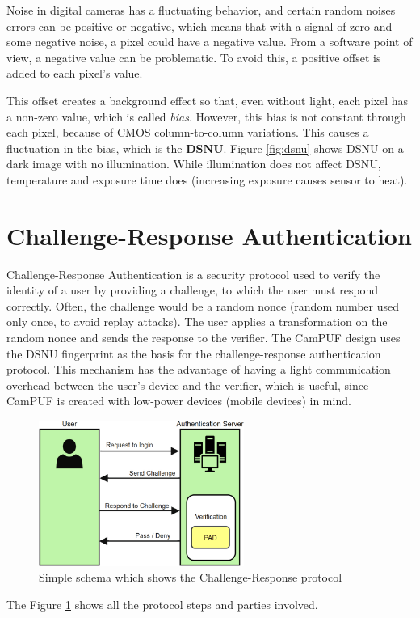 Noise in digital cameras has a fluctuating behavior, and certain random noises errors can be positive or negative, which means that with a signal of zero and some negative noise, a pixel could have a negative value.
From a software point of view, a negative value can be problematic. To avoid this, a positive offset is added to each pixel's value.

This offset creates a background effect so that, even without light, each pixel has a non-zero value, which is called \textit{bias}.
However, this bias is not constant through each pixel, because of CMOS column-to-column variations. This causes a fluctuation in the bias, which is the \textbf{DSNU}.
Figure \ref{fig:dsnu} shows DSNU on a dark image with no illumination. While illumination does not affect DSNU, temperature and exposure time does (increasing exposure causes sensor to heat).

\section{Challenge-Response Authentication}

Challenge-Response Authentication is a security protocol used to verify the identity of a user by providing a challenge, to which the user must respond correctly.
Often, the challenge would be a random nonce (random number used only once, to avoid replay attacks). The user applies a transformation on the random nonce and sends the response to the verifier.
The CamPUF design uses the DSNU fingerprint as the basis for the challenge-response authentication protocol.
This mechanism has the advantage of having a light communication overhead between the user's device and the verifier, which is useful, since CamPUF is created with low-power devices (mobile devices) in mind.

\begin{figure}[h!]                      %
    \centering
    \includegraphics[width=0.6\textwidth]{images/Challenge_Response_Auth.png}
    \caption{Simple schema which shows the Challenge-Response protocol}
    \label{fig:cr_auth}
\end{figure}

The Figure \ref{fig:cr_auth} shows all the protocol steps and parties involved.
